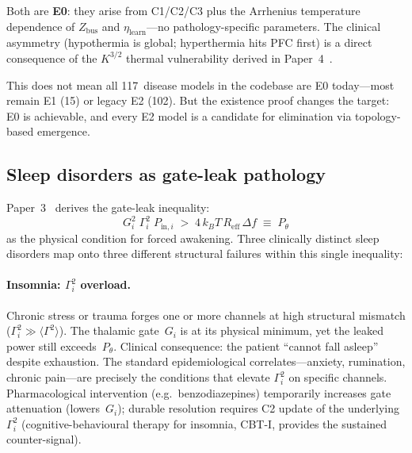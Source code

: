 \documentclass[aps,pre,twocolumn,superscriptaddress,floatfix]{revtex4-2}
\begin{document}
\noindent
Both are \textbf{E0}: they arise from C1/C2/C3 plus the
Arrhenius temperature dependence of $Z_{\mathrm{bus}}$
and $\eta_{\mathrm{learn}}$---no pathology-specific
parameters.  The clinical asymmetry (hypothermia is
global; hyperthermia hits PFC first) is a direct
consequence of the $K^{3/2}$ thermal vulnerability
derived in Paper~4~\cite{Paper4}.

This does not mean all 117~disease models in the codebase
are E0 today---most remain E1 (15) or legacy E2 (102).
But the existence proof changes the target:
E0 is achievable, and every E2 model is a candidate for
elimination via topology-based emergence.


\subsection{Sleep disorders as gate-leak pathology}
\label{sec:sleep-disorders}

Paper~3~\cite{Paper3} derives the gate-leak inequality:
\begin{equation}
  G_i^2\;\Gamma_i^2\;P_{\mathrm{in},i}
  \;>\;
  4\,k_B T\,R_{\mathrm{eff}}\,\Delta f
  \;\equiv\; P_\theta
  \tag{P3, Eq.\,10}
\end{equation}
as the physical condition for forced awakening.
Three clinically distinct sleep disorders map onto
three different structural failures within this
single inequality:

\paragraph{Insomnia: $\Gamma_i^2$ overload.}
Chronic stress or trauma forges one or more channels
at high structural mismatch ($\Gamma_i^2 \gg
\langle\Gamma^2\rangle$).
The thalamic gate~$G_i$ is at its physical minimum,
yet the leaked power still exceeds~$P_\theta$.
Clinical consequence: the patient ``cannot fall asleep''
despite exhaustion.
The standard epidemiological correlates---anxiety,
rumination, chronic pain---are precisely the conditions
that elevate $\Gamma_i^2$ on specific channels.
Pharmacological intervention (e.g.\ benzodiazepines)
temporarily increases gate attenuation (lowers~$G_i$);
durable resolution requires C2 update of the
underlying $\Gamma_i^2$
(cognitive-behavioural therapy for insomnia, CBT-I,
provides the sustained counter-signal).
\end{document}
